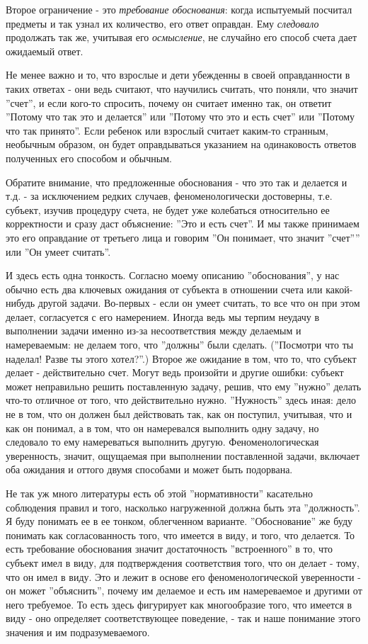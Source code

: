 \documentclass{book}
\begin{document}
Второе ограничение - это \textit{требование обоснования}: когда испытуемый посчитал предметы и так узнал их количество, его ответ оправдан. Ему \textit{следовало} продолжать так же, учитывая его \textit{осмысление}, не случайно его способ счета дает ожидаемый ответ.

Не менее важно и то, что взрослые и дети убежденны в своей оправданности в таких ответах - они ведь считают, что научились считать, что поняли, что значит ''счет'', и если кого-то спросить, почему он считает именно так, он ответит ''Потому что так это и делается'' или ''Потому что это и есть счет'' или ''Потому что так принято''. Если ребенок или взрослый считает каким-то странным, необычным образом, он будет оправдываться указанием на одинаковость ответов полученных его способом и обычным.

Обратите внимание, что предложенные обоснования - что это так и делается и т.д. - за исключением редких случаев, феноменологически достоверны, т.е. субъект, изучив процедуру счета, не будет уже колебаться относительно ее корректности и сразу даст объяснение: ''Это и есть счет''. И мы также принимаем это его оправдание от третьего лица и говорим ''Он понимает, что значит ''счет'''' или ''Он умеет считать''.

И здесь есть одна тонкость. Согласно моему описанию ''обоснования'', у нас обычно есть два ключевых ожидания от субъекта в отношении счета или какой-нибудь другой задачи. Во-первых - если он умеет считать, то все что он при этом делает, согласуется с его намерением. Иногда ведь мы терпим неудачу в выполнении задачи именно из-за несоответствия между делаемым и намереваемым: не делаем того, что ''должны'' были сделать. (''Посмотри что ты наделал! Разве ты этого хотел?''.) Второе же ожидание в том, что то, что субъект делает - действительно счет. Могут ведь произойти и другие ошибки: субъект может неправильно решить поставленную задачу, решив, что ему ''нужно'' делать что-то отличное от того, что действительно нужно. ''Нужность'' здесь иная: дело не в том, что он должен был действовать так, как он поступил, учитывая, что и как он понимал, а в том, что он намеревался выполнить одну задачу, но следовало то ему намереваться выполнить другую. Феноменологическая уверенность, значит, ощущаемая при выполнении поставленной задачи, включает оба ожидания и оттого двумя способами и может быть подорвана.

Не так уж много литературы есть об этой ''нормативности'' касательно соблюдения правил и того, насколько нагруженной должна быть эта ''должность''. Я буду понимать ее в ее тонком, облегченном варианте. ''Обоснование'' же буду понимать как согласованность того, что имеется в виду, и того, что делается. То есть требование обоснования значит достаточность ''встроенного'' в то, что субъект имел в виду, для подтверждения соответствия того, что он делает - тому, что он имел в виду. Это и лежит в основе его феноменологической уверенности - он может ''объяснить'', почему им делаемое и есть им намереваемое и другими от него требуемое. То есть здесь фигурирует как многообразие того, что имеется в виду - оно определяет соответствующее поведение, - так и наше понимание этого значения и им подразумеваемого.
\end{document}
